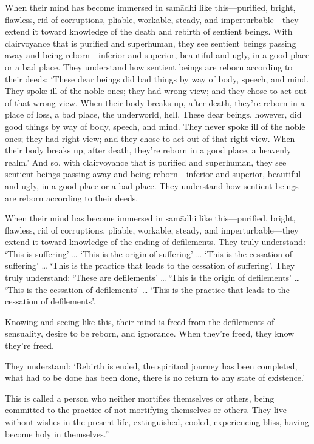 \documentclass[12pt,openany]{book}%
\begin{document}
When their mind has become immersed in \textsanskrit{samādhi} like this—purified, bright, flawless, rid of corruptions, pliable, workable, steady, and imperturbable—they extend it toward knowledge of the death and rebirth of sentient beings. With clairvoyance that is purified and superhuman, they see sentient beings passing away and being reborn—inferior and superior, beautiful and ugly, in a good place or a bad place. They understand how sentient beings are reborn according to their deeds: ‘These dear beings did bad things by way of body, speech, and mind. They spoke ill of the noble ones; they had wrong view; and they chose to act out of that wrong view. When their body breaks up, after death, they’re reborn in a place of loss, a bad place, the underworld, hell. These dear beings, however, did good things by way of body, speech, and mind. They never spoke ill of the noble ones; they had right view; and they chose to act out of that right view. When their body breaks up, after death, they’re reborn in a good place, a heavenly realm.’ And so, with clairvoyance that is purified and superhuman, they see sentient beings passing away and being reborn—inferior and superior, beautiful and ugly, in a good place or a bad place. They understand how sentient beings are reborn according to their deeds. 

When their mind has become immersed in \textsanskrit{samādhi} like this—purified, bright, flawless, rid of corruptions, pliable, workable, steady, and imperturbable—they extend it toward knowledge of the ending of defilements. They truly understand: ‘This is suffering’ … ‘This is the origin of suffering’ … ‘This is the cessation of suffering’ … ‘This is the practice that leads to the cessation of suffering’. They truly understand: ‘These are defilements’ … ‘This is the origin of defilements’ … ‘This is the cessation of defilements’ … ‘This is the practice that leads to the cessation of defilements’. 

Knowing and seeing like this, their mind is freed from the defilements of sensuality, desire to be reborn, and ignorance. When they’re freed, they know they’re freed. 

They understand: ‘Rebirth is ended, the spiritual journey has been completed, what had to be done has been done, there is no return to any state of existence.’ 

This is called a person who neither mortifies themselves or others, being committed to the practice of not mortifying themselves or others. They live without wishes in the present life, extinguished, cooled, experiencing bliss, having become holy in themselves.” 
\end{document}
